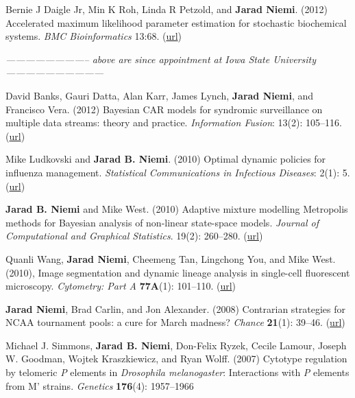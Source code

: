 \documentclass[overlapped,line]{res}
\newcommand{\sinceappt}{\emph{-------------------------- above are since appointment at Iowa State University ------------------------------}}
\newcommand{\sinceappt}{}
\begin{document}
\begin{resume}
Bernie J Daigle Jr, Min K Roh, Linda R Petzold, and {\bf Jarad Niemi}. (2012) Accelerated maximum likelihood parameter estimation for stochastic biochemical systems. \emph{BMC Bioinformatics} 13:68. (\href{http://www.biomedcentral.com/1471-2105/13/68}{url})

\sinceappt

David Banks, Gauri Datta, Alan Karr, James Lynch, {\bf Jarad Niemi}, and Francisco Vera. (2012) Bayesian CAR models for syndromic surveillance on multiple data streams: theory and practice. \emph{Information Fusion}: 13(2): 105--116. (\href{http://www.sciencedirect.com/science/article/pii/S156625350900092X}{url})

Mike Ludkovski and {\bf Jarad B. Niemi}. (2010) Optimal dynamic policies for influenza management. \emph{Statistical Communications in Infectious Diseases}: 2(1): 5. (\href{http://www.degruyter.com/view/j/scid.2010.2.1/scid.2010.2.1.1020/scid.2010.2.1.1020.xml}{url})

{\bf Jarad B. Niemi} and Mike West. (2010) Adaptive mixture modelling Metropolis methods for Bayesian analysis of non-linear state-space models. \emph{Journal of Computational and Graphical Statistics}. 19(2): 260--280. (\href{http://www.tandfonline.com/doi/abs/10.1198/jcgs.2010.08117}{url})

Quanli Wang, {\bf Jarad Niemi}, Cheemeng Tan, Lingchong You, and Mike West. (2010), Image segmentation and dynamic lineage analysis in single-cell fluorescent microscopy. \emph{Cytometry: Part A} {\bf 77A}(1): 101--110. (\href{http://onlinelibrary.wiley.com/doi/10.1002/cyto.a.20812/full}{url})

{\bf Jarad Niemi}, Brad Carlin, and Jon Alexander. (2008) Contrarian strategies for NCAA tournament pools: a cure for March madness? \emph{Chance} {\bf 21}(1): 39--46. (\href{http://amstat.tandfonline.com/doi/pdf/10.1080/09332480.2008.10722884}{url})


Michael J. Simmons, {\bf Jarad B. Niemi}, Don-Felix Ryzek, Cecile Lamour, Joseph W. Goodman, Wojtek Kraszkiewicz, and Ryan Wolff. (2007) Cytotype regulation by telomeric \emph{P} elements in \emph{Drosophila melanogaster}: Interactions with \emph{P} elements from M' strains. \emph{Genetics} {\bf 176}(4): 1957--1966


\end{resume}
\end{document}
